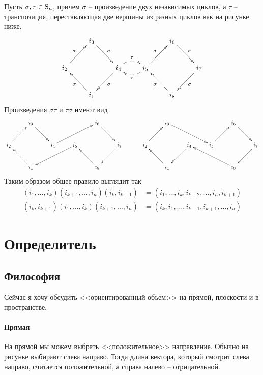 Пусть $\sigma,\tau\in\operatorname{S}_{n}$, причем $\sigma$ -- произведение двух независимых циклов, а $\tau$ -- транспозиция, переставляющая две вершины из разных циклов как на рисунке ниже.
\[
\xymatrix{
{}&{i_3}\ar[dr]^{\sigma}&{}&{}&{i_6}\ar[dr]^{\sigma}&{}\\
{i_2}\ar[ur]^{\sigma}&{}&{i_4}\ar[dl]^{\sigma}\ar@{-->}@/^10pt/[r]^{\tau}&{i_5}\ar[ur]^{\sigma}\ar@{-->}@/^10pt/[l]^{\tau}&{}&{i_7}\ar[dl]^{\sigma}\\
{}&{i_1}\ar[ul]^{\sigma}&{}&{}&{i_8}\ar[ul]^{\sigma}&{}\\
}
\]
Произведения $\sigma\tau$ и $\tau\sigma$ имеют вид
\[
\xymatrix{
	{}&{i_3}\ar[dr]&{}&{}&{i_6}\ar[dr]&{}\\
	{i_2}\ar[ur]&{}&{i_4}\ar[urr]&{i_5}\ar[dll]&{}&{i_7}\ar[dl]\\
	{}&{i_1}\ar[ul]&{}&{}&{i_8}\ar[ul]&{}\\
}
\quad\quad\quad
\xymatrix{
	{}&{i_3}\ar[drr]&{}&{}&{i_6}\ar[dr]&{}\\
	{i_2}\ar[ur]&{}&{i_4}\ar[dl]&{i_5}\ar[ur]&{}&{i_7}\ar[dl]\\
	{}&{i_1}\ar[ul]&{}&{}&{i_8}\ar[ull]&{}\\
}
\]
Таким образом общее правило выглядит так
\begin{align*}
(i_1,\ldots,i_k)(i_{k+1},\ldots,i_n)(i_k,i_{k+1}) &=(i_1,\ldots,i_k,i_{k+2},\ldots,i_n,i_{k+1})\\
(i_k,i_{k+1})(i_1,\ldots,i_k)(i_{k+1},\ldots,i_n) &= (i_k,i_1,\ldots,i_{k-1},i_{k+1},\ldots,i_n)
\end{align*}

\newpage

\section{Определитель}

\subsection{Философия}

Сейчас я хочу обсудить <<ориентированный объем>> на прямой, плоскости и в пространстве.

\paragraph{Прямая}

 На прямой мы можем выбрать <<положительное>> направление.
 Обычно на рисунке выбирают слева направо.
 Тогда длина вектора, который смотрит слева направо, считается положительной, а справа налево -- отрицательной.

